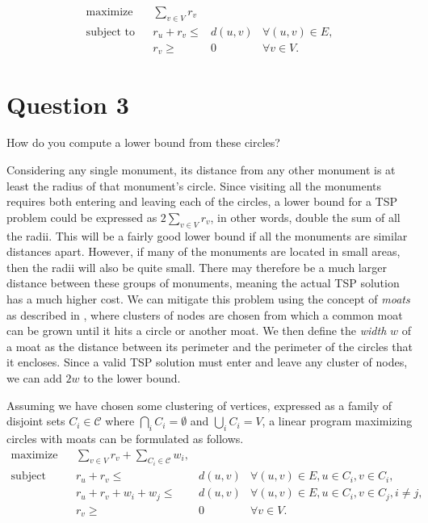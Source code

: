 \documentclass[a4paper, 10pt, oneside, article]{memoir}
\begin{document}
\begin{align*}
  \text{maximize} && \sum_{v\in V} r_{v} \\
  \text{subject to} && r_{u} + r_{v} \leq{}& d(u,v) & \forall (u,v) \in E, \\
                    && r_{v} \geq{}& 0 & \forall v \in V.
\end{align*}

\section*{Question 3}
How do you compute a lower bound from these circles?

Considering any single monument, its distance from any other monument
is at least the radius of that monument's circle. Since visiting all
the monuments requires both entering and leaving each of the circles,
a lower bound for a TSP problem could be expressed as $2 \sum_{v \in
  V} r_{v}$, in other words, double the sum of all the radii.  This
will be a fairly good lower bound if all the monuments are similar
distances apart. However, if many of the monuments are located in
small areas, then the radii will also be quite small. There may
therefore be a much larger distance between these groups of monuments,
meaning the actual TSP solution has a much higher cost. We can
mitigate this problem using the concept of \emph{moats} as described
in \cite{zones}, where clusters of nodes are chosen from which a
common moat can be grown until it hits a circle or another moat. We
then define the \emph{width} $w$ of a moat as the distance between its
perimeter and the perimeter of the circles that it encloses. Since a
valid TSP solution must enter and leave any cluster of nodes, we can
add $2w$ to the lower bound.

Assuming we have chosen some clustering of vertices, expressed as a
family of disjoint sets $C_i \in \mathcal{C}$ where $\bigcap_i C_i =
\emptyset$ and $\bigcup_i C_i = V$, a linear program maximizing
circles with moats can be formulated as follows.
\begin{align*}
  \text{maximize} && \sum_{v\in V} r_{v} + \sum_{C_i \in \mathcal{C}} w_i, \\
  \text{subject to} && r_{u} + r_{v} \leq{}& d(u,v) & \forall (u,v) \in E, u \in C_i, v \in C_i, \\
                    && r_u + r_v + w_i + w_j \leq{}& d(u,v) & \forall (u,v) \in E, u \in C_i, v \in C_j, i \not= j, \\
                    && r_{v} \geq{}& 0 & \forall v \in V.
\end{align*}
\end{document}
